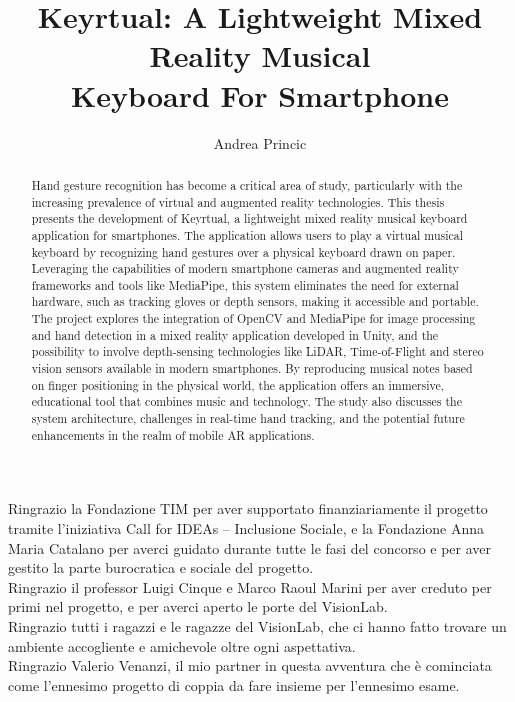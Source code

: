 \documentclass[twoside, english]{sapthesis}
\title{Keyrtual: A Lightweight Mixed Reality Musical \\Keyboard For Smartphone}
\author{Andrea Princic}
\begin{document}
	\frontmatter
	\maketitle

	\setcounter{tocdepth}{2}
	\tableofcontents

	\mainmatter

	\begin{abstract}
		Hand gesture recognition has become a critical area of study,
		particularly with the increasing prevalence of virtual and augmented reality technologies.
		This thesis presents the development of Keyrtual,
		a lightweight mixed reality musical keyboard application for smartphones.
		The application allows users to play a virtual musical keyboard by
		recognizing hand gestures over a physical keyboard drawn on paper.
		Leveraging the capabilities of modern smartphone cameras and augmented reality frameworks and tools
		like MediaPipe, this system eliminates the need for external hardware,
		such as tracking gloves or depth sensors, making it accessible and portable.
		The project explores the integration of OpenCV and MediaPipe for image processing and hand detection
		in a mixed reality application developed in Unity,
		and the possibility to involve depth-sensing technologies like LiDAR, Time-of-Flight
		and stereo vision sensors available in modern smartphones.
		By reproducing musical notes based on finger positioning in the physical world,
		the application offers an immersive, educational tool that combines music and technology.
		The study also discusses the system architecture, challenges in real-time hand tracking,
		and the potential future enhancements in the realm of mobile AR applications.
	\end{abstract}

	\begin{acknowledgments}[Ringraziamenti]
		Ringrazio la Fondazione TIM per aver supportato finanziariamente il progetto tramite l'iniziativa
		Call for IDEAs -- Inclusione Sociale, e la Fondazione Anna Maria Catalano per averci guidato
		durante tutte le fasi del concorso e per aver gestito la parte burocratica e sociale del progetto.
		\\
		Ringrazio il professor Luigi Cinque e Marco Raoul Marini per aver creduto per primi nel progetto,
		e per averci aperto le porte del VisionLab.
		\\
		Ringrazio tutti i ragazzi e le ragazze del VisionLab,
		che ci hanno fatto trovare un ambiente accogliente e amichevole oltre ogni aspettativa.
		\\
		Ringrazio Valerio Venanzi, il mio partner in questa avventura che è cominciata come
		l'ennesimo progetto di coppia da fare insieme per l'ennesimo esame.
	\end{acknowledgments}
\end{document}
